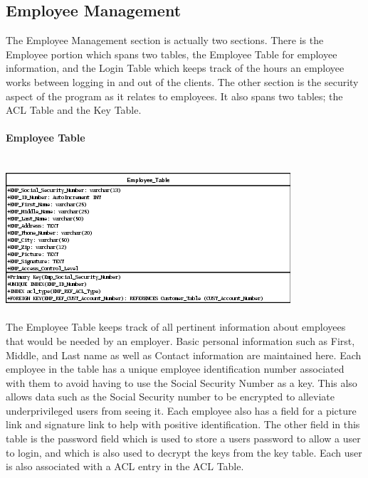 \documentclass{report}
\begin{document}
\begin{itemize}
        \subsection{Employee Management}

        The Employee Management section is actually two sections. There is the Employee portion which
        spans two tables, the Employee Table for employee information, and the Login Table which
        keeps track of the hours an employee works between logging in and out of the clients. The
        other section is the security aspect of the program as it relates to employees. It also spans
        two tables; the ACL Table and the Key Table.\\
        \\
        {\bf Employee Table}\\
        \\
        \\
        \includegraphics{Tables/EmployeeTable.png}
        \\
        \\
        The Employee Table keeps track of all pertinent information about employees that would
        be needed by an employer. Basic personal information such as First, Middle, and Last name
        as well as Contact information are maintained here. Each employee in the table has a unique
        employee identification number associated with them to avoid having to use the Social
        Security Number as a key. This also allows data such as the Social Security number to be
        encrypted to alleviate underprivileged users from seeing it. Each employee also has a
        field for a picture link and signature link to help with positive identification. The other
        field in this table is the password field which is used to store a users password to allow
        a user to login, and which is also used to decrypt the keys from the key table. Each user
        is also associated with a ACL entry in the ACL Table.\\
        \\

\end{itemize}
\end{document}
